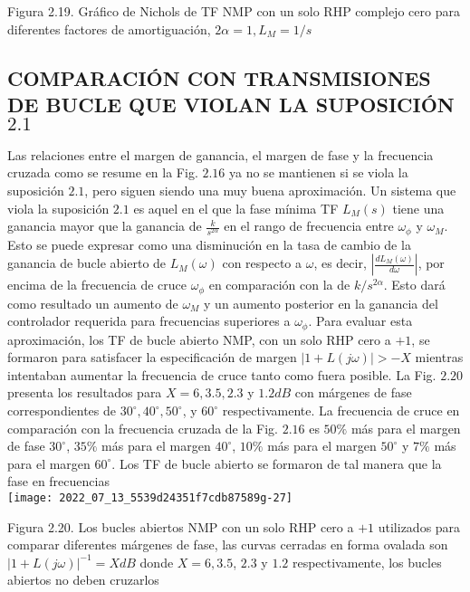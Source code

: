 Figura 2.19. Gráfico de Nichols de TF NMP con un solo RHP complejo cero para diferentes factores de amortiguación, $2 \alpha=1, L_{M}=1 / s$

\subsection{COMPARACIÓN CON TRANSMISIONES DE BUCLE QUE VIOLAN LA SUPOSICIÓN $2.1$}
Las relaciones entre el margen de ganancia, el margen de fase y la frecuencia cruzada como se resume en la Fig. $2.16$ ya no se mantienen si se viola la suposición $2.1$, pero siguen siendo una muy buena aproximación. Un sistema que viola la suposición $2.1$ es aquel en el que la fase mínima TF $L_{M}(s)$ tiene una ganancia mayor que la ganancia de $\frac{k}{s^{2 \alpha}}$ en el rango de frecuencia entre $\omega_{\phi}$ y $\omega_{M}$. Esto se puede expresar como una disminución en la tasa de cambio de la ganancia de bucle abierto de $L_{M}(\omega)$ con respecto a $\omega$, es decir, $\left|\frac{d L_{M}(\omega)}{d \omega}\right|$, por encima de la frecuencia de cruce $\omega_{\phi}$ en comparación con la de $k / s^{2 \alpha}$. Esto dará como resultado un aumento de $\omega_{M}$ y un aumento posterior en la ganancia del controlador requerida para frecuencias superiores a $\omega_{\phi}$. Para evaluar esta aproximación, los TF de bucle abierto NMP, con un solo RHP cero a $+1$, se formaron para satisfacer la especificación de margen $|1+L(j \omega)|>-X$ mientras intentaban aumentar la frecuencia de cruce tanto como fuera posible. La Fig. $2.20$ presenta los resultados para $X=6,3.5,2.3$ y $1.2 d B$ con márgenes de fase correspondientes de $30^{\circ}, 40^{\circ}, 50^{\circ}$, y $60^{\circ}$ respectivamente. La frecuencia de cruce en comparación con la frecuencia cruzada de la Fig. $2.16$ es $50 \%$ más para el margen de fase $30^{\circ}$, $35 \%$ más para el margen $40^{\circ}$, $10 \%$ más para el margen $50^{\circ}$ y $7 \%$ más para el margen $60^{\circ}$. Los TF de bucle abierto se formaron de tal manera que la fase en frecuencias\\

\texttt{[image: 2022\_07\_13\_5539d24351f7cdb87589g-27]}

Figura 2.20. Los bucles abiertos NMP con un solo RHP cero a $+1$ utilizados para comparar diferentes márgenes de fase, las curvas cerradas en forma ovalada son $|1+L(j \omega)|^{-1}=X d B$ donde $X=6,3.5$, $2.3$ y $1.2$ respectivamente, los bucles abiertos no deben cruzarlos

